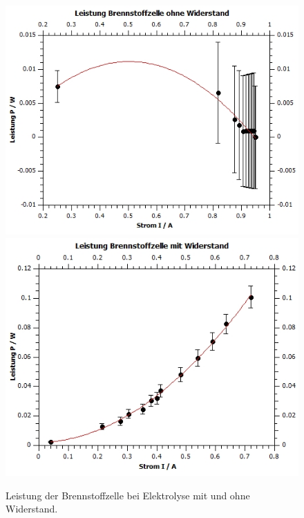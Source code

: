 \documentclass[12pt,a4paper,twoside]{article}
\begin{document}
\begin{figure}[H]
    \centering
    \includegraphics[width=0.6\linewidth]{nudes/brennstoff leistung ohne r.jpg}
    \includegraphics[width=0.6\linewidth]{nudes/brennstoff leistung mit r.jpg}
    \caption{Leistung der Brennstoffzelle bei Elektrolyse mit und ohne Widerstand.}
    \label{fig:zusammenfassung Brennstoffzelle Leistung}
\end{figure}
\end{document}
